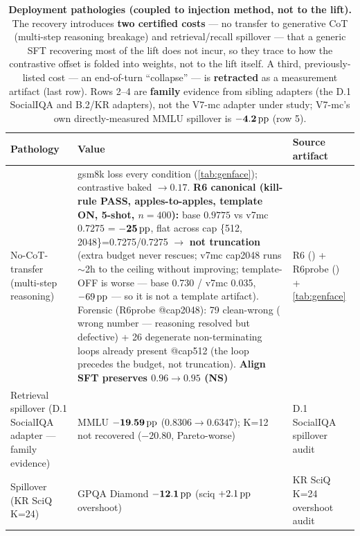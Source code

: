 \begin{table}[tbp]
\centering
\begin{threeparttable}
\caption{\textbf{Deployment pathologies (coupled to injection method, not to the
lift).} The recovery introduces \textbf{two certified costs} --- no transfer to
generative CoT (multi-step reasoning breakage) and retrieval/recall spillover ---
that a generic SFT recovering most of the lift does not incur, so they trace to how
the contrastive offset is folded into weights, not to the lift itself. A third,
previously-listed cost --- an end-of-turn ``collapse'' --- is \textbf{retracted} as
a measurement artifact (last row). Rows 2--4 are \textbf{family} evidence from
sibling adapters (the D.1 SocialIQA and B.2/KR adapters), not the V7-mc adapter
under study; V7-mc's own directly-measured MMLU spillover is $\mathbf{-4.2\pp}$
(row 5).}
\label{tab:pathologies}
\footnotesize
\begin{tabular}{L{3.4cm} L{9.0cm} L{2.4cm}}
\toprule
Pathology & Value & Source artifact \\
\midrule
No-CoT-transfer (multi-step reasoning) & gsm8k loss every condition
(\cref{tab:genface}); contrastive baked ${\rightarrow}0.17$. \textbf{R6 canonical
(kill-rule PASS, apples-to-apples, template ON, 5-shot, $n{=}400$):} base
$\mathbf{0.9775}$ vs v7mc $\mathbf{0.7275}$ = $\mathbf{-25\,\mathrm{pp}}$, flat across cap
\{512, 2048\}=0.7275/0.7275 $\rightarrow$ \textbf{not truncation} (extra budget
never rescues; v7mc cap2048 runs ${\sim}$2h to the ceiling without improving;
template-OFF is worse --- base 0.730 / v7mc 0.035, $-69\,\mathrm{pp}$ --- so it is not a
template artifact). Forensic (R6probe @cap2048): 79 clean-wrong (\code{\#\#\#\#}
wrong number --- reasoning resolved but defective) + 26 degenerate non-terminating
loops already present @cap512 (the loop precedes the budget, not truncation).
\textbf{Align SFT preserves $0.96{\rightarrow}0.95$ (NS)} & R6
() + R6probe () +
\cref{tab:genface} \\
\addlinespace
Retrieval spillover (D.1 SocialIQA adapter --- family evidence) & MMLU
$\mathbf{-19.59\,\mathrm{pp}}$ ($0.8306{\rightarrow}0.6347$); K=12 not recovered ($-20.80$,
Pareto-worse) & D.1 SocialIQA spillover audit \\
Spillover (KR SciQ~\citep{SciQ} K=24) & GPQA Diamond $\mathbf{-12.1\,\mathrm{pp}}$ (sciq $+2.1\,\mathrm{pp}$
overshoot) & KR SciQ K=24 overshoot audit \\

\end{tabular}
\end{threeparttable}
\end{table}
